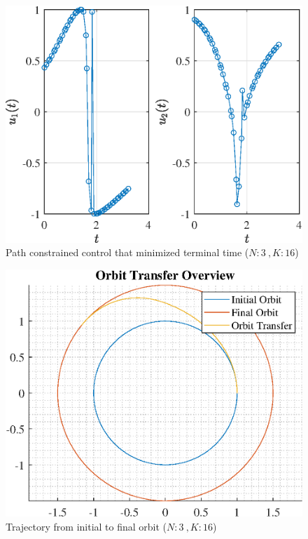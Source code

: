\documentclass[]{article}
\begin{document}
\begin{figure}
	\centering
	\includegraphics[scale=0.75]{path_N3_K16_C3_tf.eps}
	\caption{Path constrained control that minimized terminal time (\(N:3\ , K:16\))}
	\label{fig:path_N3_K16_C3_tf}
\end{figure}
\begin{figure}
	\centering
	\includegraphics[scale=0.75]{orbit_N3_K16_C3_tf.eps}
	\caption{Trajectory from initial to final orbit (\(N:3\ , K:16\))}
	\label{fig:orbit_N3_K16_C3_tf}
\end{figure}
\end{document}
